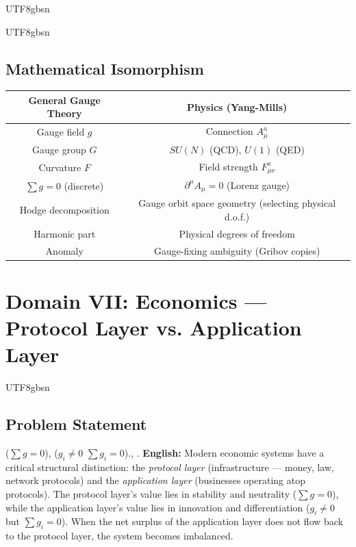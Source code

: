 \documentclass[11pt,a4paper]{article}
\begin{document}
\begin{CJK}{UTF8}{gbsn}
{\begin{CJK}{UTF8}{gbsn}
\subsection{Mathematical Isomorphism}
\begin{center}
\begin{tabular}{c|c}
    \textbf{General Gauge Theory} & \textbf{Physics (Yang-Mills)} \\
    \hline
    Gauge field $g$ & Connection $A_\mu^a$ \\
    Gauge group $G$ & $SU(N)$ (QCD), $U(1)$ (QED) \\
    Curvature $F$ & Field strength $F_{\mu\nu}^a$ \\
    $\sum g = 0$ (discrete) & $\partial^\mu A_\mu = 0$ (Lorenz gauge) \\
    Hodge decomposition & Gauge orbit space geometry (selecting physical d.o.f.) \\
    Harmonic part & Physical degrees of freedom \\
    Anomaly & Gauge-fixing ambiguity (Gribov copies) \\
\end{tabular}
\end{center}
\end{CJK}
\section{Domain VII: Economics --- Protocol Layer vs. Application Layer}
\label{sec:economics}
\begin{CJK}{UTF8}{gbsn}
\subsection{Problem Statement}
\noindent
($\sum g = 0$), ($g_i \neq 0$ 
$\sum g_i = 0$)., .
\vspace{0.3cm}
\noindent
\textbf{English:} Modern economic systems have a critical structural distinction: the
\textit{protocol layer} (infrastructure --- money, law, network protocols) and the
\textit{application layer} (businesses operating atop protocols). The protocol layer's
value lies in stability and neutrality ($\sum g = 0$), while the application layer's
value lies in innovation and differentiation ($g_i \neq 0$ but $\sum g_i = 0$).
When the net surplus of the application layer does not flow back to the protocol layer,
the system becomes imbalanced.

\end{CJK}}
\end{CJK}
\end{document}
